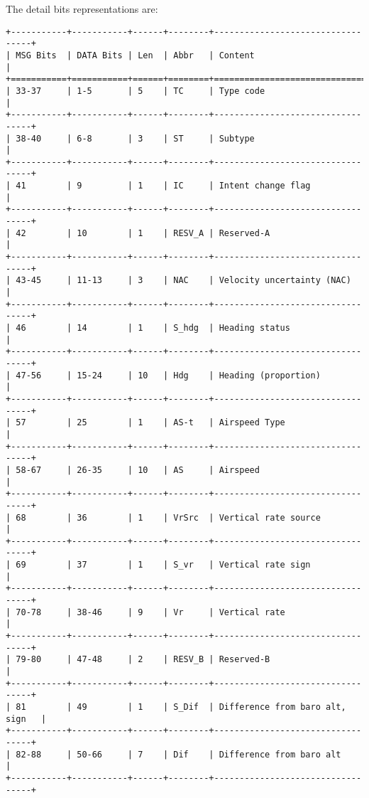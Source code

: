 The detail bits representations are:

\begin{verbatim}
+-----------+-----------+------+--------+----------------------------------+
| MSG Bits  | DATA Bits | Len  | Abbr   | Content                          |
+===========+===========+======+========+==================================+
| 33-37     | 1-5       | 5    | TC     | Type code                        |
+-----------+-----------+------+--------+----------------------------------+
| 38-40     | 6-8       | 3    | ST     | Subtype                          |
+-----------+-----------+------+--------+----------------------------------+
| 41        | 9         | 1    | IC     | Intent change flag               |
+-----------+-----------+------+--------+----------------------------------+
| 42        | 10        | 1    | RESV_A | Reserved-A                       |
+-----------+-----------+------+--------+----------------------------------+
| 43-45     | 11-13     | 3    | NAC    | Velocity uncertainty (NAC)       |
+-----------+-----------+------+--------+----------------------------------+
| 46        | 14        | 1    | S_hdg  | Heading status                   |
+-----------+-----------+------+--------+----------------------------------+
| 47-56     | 15-24     | 10   | Hdg    | Heading (proportion)             |
+-----------+-----------+------+--------+----------------------------------+
| 57        | 25        | 1    | AS-t   | Airspeed Type                    |
+-----------+-----------+------+--------+----------------------------------+
| 58-67     | 26-35     | 10   | AS     | Airspeed                         |
+-----------+-----------+------+--------+----------------------------------+
| 68        | 36        | 1    | VrSrc  | Vertical rate source             |
+-----------+-----------+------+--------+----------------------------------+
| 69        | 37        | 1    | S_vr   | Vertical rate sign               |
+-----------+-----------+------+--------+----------------------------------+
| 70-78     | 38-46     | 9    | Vr     | Vertical rate                    |
+-----------+-----------+------+--------+----------------------------------+
| 79-80     | 47-48     | 2    | RESV_B | Reserved-B                       |
+-----------+-----------+------+--------+----------------------------------+
| 81        | 49        | 1    | S_Dif  | Difference from baro alt, sign   |
+-----------+-----------+------+--------+----------------------------------+
| 82-88     | 50-66     | 7    | Dif    | Difference from baro alt         |
+-----------+-----------+------+--------+----------------------------------+
\end{verbatim}

